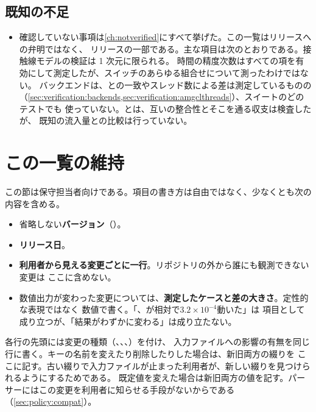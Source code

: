 \subsection*{既知の不足}

\begin{itemize}
  \item 確認していない事項は\cref{ch:notverified}にすべて挙げた。この一覧はリリースへの弁明ではなく、
    リリースの一部である。主な項目は次のとおりである。接触線モデルの検証は 1 次元に限られる。
    時間の精度次数はすべての項を有効にして測定したが、スイッチのあらゆる組合せについて測ったわけではない。
    バックエンドは、との一致やスレッド数による差は測定しているものの
    （\cref{sec:verification:backends,sec:verification:amgclthreads}）、スイートのどのテストでも
    使っていない。とは、互いの整合性とそこを通る収支は検査したが、
    既知の流入量との比較は行っていない。
\end{itemize}

\section{この一覧の維持}
\label{sec:rev:keeping}

この節は保守担当者向けである。項目の書き方は自由ではなく、少なくとも次の内容を含める。

\begin{itemize}
  \item 省略しない\textbf{バージョン}（）。
  \item \textbf{リリース日}。
  \item \textbf{利用者から見える変更ごとに一行}。リポジトリの外から誰にも観測できない変更は
    ここに含めない。
  \item 数値出力が変わった変更については、\textbf{測定したケースと差の大きさ}。定性的な表現ではなく
    数値で書く。「、が相対で$3.2\times10^{-4}$動いた」は
    項目として成り立つが、「結果がわずかに変わる」は成り立たない。
\end{itemize}

各行の先頭には変更の種類（、、、）を付け、
入力ファイルへの影響の有無を同じ行に書く。キーの名前を変えたり削除したりした場合は、新旧両方の綴りを
ここに記す。古い綴りで入力ファイルが止まった利用者が、新しい綴りを見つけられるようにするためである。
既定値を変えた場合は新旧両方の値を記す。パーサーにはこの変更を利用者に知らせる手段がないからである
（\cref{sec:policy:compat}）。

